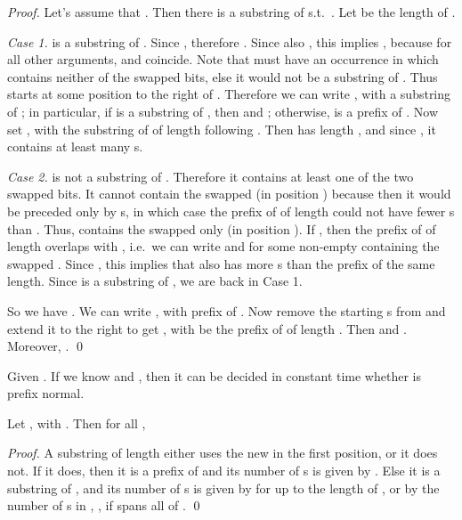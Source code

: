 \documentclass[11pt,a4paper]{llncs}
\begin{document}
\begin{proof}
Let's assume that . Then there is a substring  of  s.t.\ . Let  be the length of .

{\em Case 1.}  is a substring of . Since , therefore . Since also , this implies , because for all other arguments,  and  coincide. Note that  must have an occurrence in  which contains neither of the swapped bits, else it would not be a substring of . Thus  starts at some position to the right of . Therefore we can write , with  a substring of ; in particular, if  is a substring of , then  and ; otherwise,  is a prefix of . Now set , with  the substring of  of length  following . Then  has length , and since ,  it contains at least  many s.

{\em Case 2.}  is not a substring of . Therefore it contains at least one of the two swapped bits. It cannot contain the swapped  (in position ) because then it would be preceded only by s, in which case the prefix of  of length  could not have fewer s than . Thus,  contains the swapped  only (in position ). If , then the prefix of  of length  overlaps with , i.e.\ we can write  and  for some non-empty  containing the swapped . Since , this implies that also  has more s than the prefix of the same length. Since  is a substring of , we are back in Case 1. 

So we have . We can write , with  prefix of . Now remove the starting s from  and extend it to the right to get , with  be the prefix of  of length . Then  and . Moreover, . \hfill \qed
\end{proof}


\begin{corollary}\label{coro:isPNF}
Given . If we know  and , then it can be decided in constant time whether  is prefix normal.
\end{corollary}

\begin{lemma}
\label{lemma:FPCalculate}
Let , with . Then for all ,



\end{lemma}

\begin{proof}
A substring of length  either uses the new  in the first position, or it does not. If it does, then it is a prefix of  and its number of s is given by . Else it is a substring of , and its number of s is given by  for  up to the length of , or by the number of s in , , if  spans all of . \hfill \qed
\end{proof}
\end{document}

